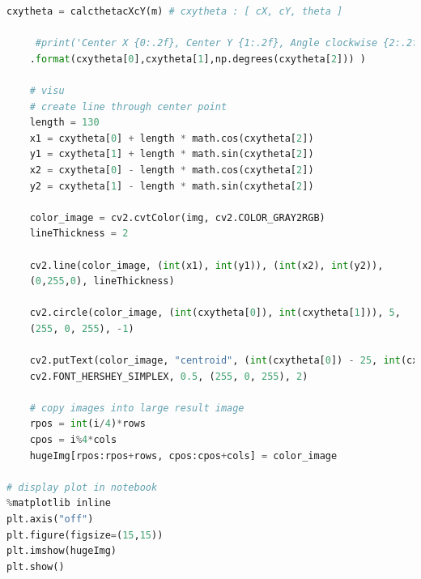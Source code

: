 \documentclass[a4paper]{report}
\begin{document}
\begin{lstlisting}[language=Python, caption=Simulation Numeric]
    cxytheta = calcthetacXcY(m) # cxytheta : [ cX, cY, theta ]
    
     #print('Center X {0:.2f}, Center Y {1:.2f}, Angle clockwise {2:.2f}
    .format(cxytheta[0],cxytheta[1],np.degrees(cxytheta[2])) )
    
    # visu
    # create line through center point
    length = 130
    x1 = cxytheta[0] + length * math.cos(cxytheta[2])
    y1 = cxytheta[1] + length * math.sin(cxytheta[2]) 
    x2 = cxytheta[0] - length * math.cos(cxytheta[2])
    y2 = cxytheta[1] - length * math.sin(cxytheta[2]) 
 
    color_image = cv2.cvtColor(img, cv2.COLOR_GRAY2RGB)
    lineThickness = 2
    
    cv2.line(color_image, (int(x1), int(y1)), (int(x2), int(y2)), 
    (0,255,0), lineThickness)
    
    cv2.circle(color_image, (int(cxytheta[0]), int(cxytheta[1])), 5,
    (255, 0, 255), -1)
    
    cv2.putText(color_image, "centroid", (int(cxytheta[0]) - 25, int(cxytheta[1]) - 25),
    cv2.FONT_HERSHEY_SIMPLEX, 0.5, (255, 0, 255), 2)
    
    # copy images into large result image
    rpos = int(i/4)*rows
    cpos = i%4*cols
    hugeImg[rpos:rpos+rows, cpos:cpos+cols] = color_image

# display plot in notebook
%matplotlib inline
plt.axis("off")
plt.figure(figsize=(15,15))
plt.imshow(hugeImg)
plt.show()

\end{lstlisting}
\end{document}
